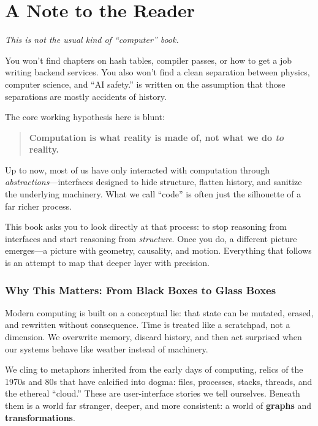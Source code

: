 \chapter*{A Note to the Reader}

\emph{This is not the usual kind of ``computer'' book.}

You won't find chapters on hash tables, compiler passes, or how to get a job writing backend services. You also won't find a clean separation between physics, computer science, and ``AI safety.'' \COMPUTER{} is written on the assumption that those separations are mostly accidents of history.

The core working hypothesis here is blunt:
\begin{quote}
\textbf{Computation is what reality is made of, not what we do \emph{to} reality.}
\end{quote}

Up to now, most of us have only interacted with computation through 
\emph{abstractions}—interfaces designed to hide structure, flatten history, and 
sanitize the underlying machinery. What we call “code” is often just the 
silhouette of a far richer process.

This book asks you to look directly at that process: to stop reasoning from
interfaces and start reasoning from \emph{structure}. Once you do, a different 
picture emerges—a picture with geometry, causality, and motion. Everything that 
follows is an attempt to map that deeper layer with precision.


\subsection*{Why This Matters: From Black Boxes to Glass Boxes}

Modern computing is built on a conceptual lie: that state can be mutated, erased, and rewritten without consequence. Time is treated like a scratchpad, not a dimension. We overwrite memory, discard history, and then act surprised when our systems behave like weather instead of machinery.

We cling to metaphors inherited from the early days of computing, relics of the 1970s and 80s that have calcified into dogma: files, processes, stacks, threads, and the ethereal ``cloud.'' These are user-interface stories we tell ourselves. Beneath them is a world far stranger, deeper, and more consistent: a world of \textbf{graphs} and \textbf{transformations}.

